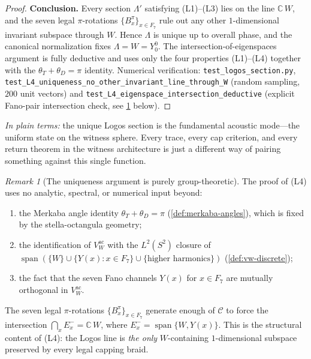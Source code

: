 \documentclass[11pt,a4paper]{article}
\theoremstyle{plain}
\theoremstyle{definition}
\theoremstyle{remark}
\newtheorem{remark}[theorem]{Remark}
\numberwithin{equation}{section}
\newcommand{\Complex}{\mathbb{C}}
\DeclareMathOperator{\spn}{span}
\begin{document}
\begin{proof}
\smallskip
\textbf{Conclusion.}  Every section $\Lambda'$ satisfying
(L1)--(L3) lies on the line $\Complex\,W$, and the seven legal
$\pi$-rotations $\{B_x^{\pi}\}_{x\in F_7}$ rule out any other
$1$-dimensional invariant subspace through $W$.  Hence $\Lambda$
is unique up to overall phase, and the canonical normalization
fixes $\Lambda=W=Y_0^0$.  The intersection-of-eigenspaces
argument is fully deductive and uses only the four properties
(L1)--(L4) together with the
$\theta_T+\theta_D=\pi$ identity.  Numerical verification:
\texttt{test\_logos\_section.py},
\texttt{test\_L4\_uniqueness\_no\_other\_invariant\_line\_through\_W}
(random sampling, $200$ unit vectors) and
\texttt{test\_L4\_eigenspace\_intersection\_deductive}
(explicit Fano-pair intersection check, see
\cref{rmk:logos-uniqueness-deductive} below).
\end{proof}

\noindent\emph{In plain terms:} the unique Logos section is the
fundamental acoustic mode---the uniform state on the witness
sphere.  Every trace, every cap criterion, and every return theorem
in the witness architecture is just a different way of pairing
something against this single function.

\begin{remark}[The uniqueness argument is purely group-theoretic]
\label{rmk:logos-uniqueness-deductive}
The proof of (L4) uses no analytic, spectral, or numerical input
beyond:
\begin{enumerate}
  \item[(i)] the Merkaba angle identity $\theta_T+\theta_D=\pi$
        (\cref{def:merkaba-angles}), which is fixed by the
        stella-octangula geometry;
  \item[(ii)] the identification of $V_W^{\mathrm{ac}}$ with the
        $L^2(S^2)$ closure of $\spn(\{W\}\cup\{Y(x):x\in F_7\}
        \cup\{\text{higher harmonics}\})$
        (\cref{def:vw-discrete});
  \item[(iii)] the fact that the seven Fano channels $Y(x)$
        for $x\in F_7$ are mutually orthogonal in
        $V_W^{\mathrm{ac}}$.
\end{enumerate}
The seven legal $\pi$-rotations $\{B_x^{\pi}\}_{x\in F_7}$
generate enough of $\mathcal{C}$ to force the intersection
$\bigcap_x E_x^{-}=\Complex\,W$, where $E_x^{-}=\spn\{W,Y(x)\}$.
This is the structural content of (L4): the Logos line is
\emph{the only} $W$-containing $1$-dimensional subspace
preserved by every legal capping braid.
\end{remark}
\end{document}
